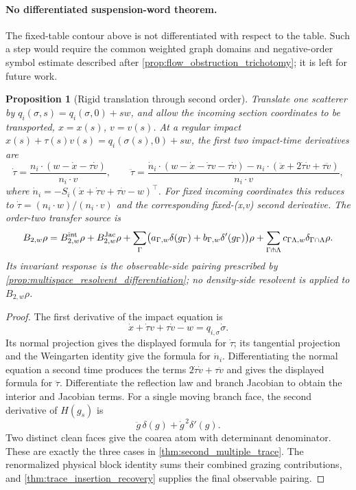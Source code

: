 \documentclass[11pt]{amsart}
\theoremstyle{compactplain}
\newtheorem*{proposition*}{Proposition}
\theoremstyle{compactdefinition}
\theoremstyle{compactremark}
\begin{document}
\paragraph{No differentiated suspension-word theorem.}
The fixed-table contour above is not differentiated with respect to the table.
Such a step would require the common weighted graph domains and negative-order
symbol estimate described after \cref{prop:flow_obstruction_trichotomy}; it is
left for future work.
\begin{proposition*}[Rigid translation through second order]
Translate one scatterer by \(q_i(\sigma,s)=q_i(\sigma,0)+sw\), and allow the
incoming section coordinates to be transported, \(x=x(s)\), \(v=v(s)\).  At a
regular impact
\(x(s)+\tau(s)v(s)=q_i(\sigma(s),0)+sw\), the first two impact-time derivatives
are
\[
  \dot\tau=
  \frac{n_i\cdot(w-\dot x-\tau\dot v)}{n_i\cdot v},\qquad
  \ddot\tau
  =
  \frac{
    \dot n_i\cdot(w-\dot x-\dot\tau v-\tau\dot v)
    -n_i\cdot(\ddot x+2\dot\tau\dot v+\tau\ddot v)
  }{n_i\cdot v},
\]
where
\(\dot n_i=-S_i(\dot x+\dot\tau v+\tau\dot v-w)^{\top}\).
For fixed incoming coordinates this reduces to
\(\dot\tau=(n_i\cdot w)/(n_i\cdot v)\) and the corresponding fixed-(x,v)
second derivative.  The order-two
transfer source is
\[
  B_{2,w}\rho
  =
  B_{2,w}^{\rm int}\rho+B_{2,w}^{\rm Jac}\rho
  +\sum_{\Gamma}
   \bigl(a_{\Gamma,w}\delta(g_\Gamma)
        +b_{\Gamma,w}\delta'(g_\Gamma)\bigr)\rho
  +\sum_{\Gamma\pitchfork\Lambda}
   c_{\Gamma\Lambda,w}\delta_{\Gamma\cap\Lambda}\rho .
\]
Its invariant response is the observable-side pairing prescribed by
\cref{prop:multispace_resolvent_differentiation}; no density-side resolvent is
applied to \(B_{2,w}\rho\).
\end{proposition*}

\begin{proof}
The first derivative of the impact equation is
\[
 \dot x+\dot\tau v+\tau\dot v-w=q_{i,\sigma}\dot\sigma .
\]
Its normal projection gives the displayed formula for \(\dot\tau\); its
tangential projection and the Weingarten identity give the formula for
\(\dot n_i\).  Differentiating the normal equation a second time produces the
terms \(2\dot\tau\dot v+\tau\ddot v\) and gives the displayed formula for
\(\ddot\tau\).  Differentiate the
reflection law and branch Jacobian to obtain the interior and Jacobian terms.
For a single moving branch face, the second derivative of \(H(g_s)\) is
\[
  \ddot g\,\delta(g)+\dot g^{\,2}\delta'(g).
\]
Two distinct clean faces give the coarea atom with determinant denominator.
These are exactly the three cases in
\cref{thm:second_multiple_trace}.  The renormalized physical block identity
sums their combined grazing contributions, and
\cref{thm:trace_insertion_recovery} supplies the final observable pairing.
\end{proof}
\end{document}
